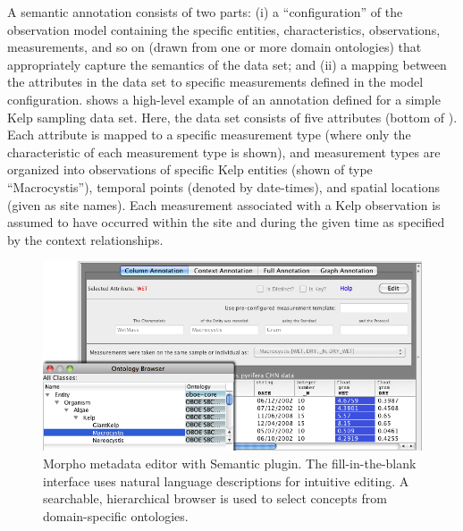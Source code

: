  A semantic annotation consists of two
parts: (i) a ``configuration'' of the observation model containing the
specific entities, characteristics, observations, measurements, and so
on (drawn from one or more domain ontologies) that appropriately
capture the semantics of the data set; and (ii) a mapping between the
attributes in the data set to specific measurements defined in the
model configuration.  shows a high-level
example of an annotation defined for a simple Kelp sampling data
set. Here, the data set consists of five attributes (bottom of
). Each attribute is mapped to a specific
measurement type (where only the characteristic of each measurement
type is shown), and measurement types are organized into observations
of specific Kelp entities (shown of type ``Macrocystis''), temporal
points (denoted by date-times), and spatial locations (given as site
names). Each measurement associated with a Kelp observation is assumed
to have occurred within the site and during the given time as
specified by the context relationships.

\begin{figure}[!t]
\centering
\includegraphics[width=1.0\textwidth]{images/morpho-annotation-widget.png}
\caption{Morpho metadata editor with Semantic
  plugin. The fill-in-the-blank interface uses
  natural language descriptions for intuitive editing. A searchable, hierarchical browser is
  used to select concepts from domain-specific ontologies.}
\label{fig:morpho-annotation}
\end{figure}


